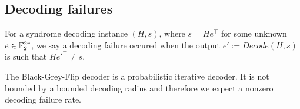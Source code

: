 \subsection{Decoding failures}

\begin{defn}
For a syndrome decoding instance $(H,s)$, where $s = He^\top$ for some unknown $e \in \mathbb{F}_2^{2r}$, we say a decoding failure occured when the output $e' := Decode(H,s)$ is such that $He'^\top \neq s$.
\end{defn}

\begin{remark}
The Black-Grey-Flip decoder is a probabilistic iterative decoder. It is not bounded by a bounded decoding radius and therefore we expect a nonzero decoding failure rate.
\end{remark}

